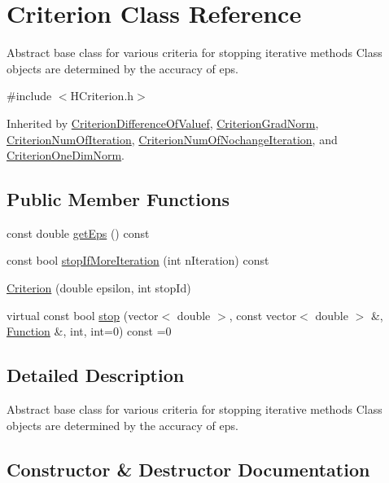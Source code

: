 \hypertarget{class_criterion}{}\section{Criterion Class Reference}
\label{class_criterion}


Abstract base class for various criteria for stopping iterative methods Class objects are determined by the accuracy of eps.  




{\ttfamily \#include $<$H\+Criterion.\+h$>$}



Inherited by \hyperlink{class_criterion_difference_of_valuef}{Criterion\+Difference\+Of\+Valuef}, \hyperlink{class_criterion_grad_norm}{Criterion\+Grad\+Norm}, \hyperlink{class_criterion_num_of_iteration}{Criterion\+Num\+Of\+Iteration}, \hyperlink{class_criterion_num_of_nochange_iteration}{Criterion\+Num\+Of\+Nochange\+Iteration}, and \hyperlink{class_criterion_one_dim_norm}{Criterion\+One\+Dim\+Norm}.

\subsection*{Public Member Functions}
\begin{DoxyCompactItemize}
\item 
const double \hyperlink{class_criterion_a1d04f36050bb555469cea3e9a2f7b6f0}{get\+Eps} () const
\item 
const bool \hyperlink{class_criterion_a579d93bfa87d36a3ae64a39fe3c2d172}{stop\+If\+More\+Iteration} (int n\+Iteration) const
\item 
\hyperlink{class_criterion_a393fa31a40959a1951ab5cfa2fd84be5}{Criterion} (double epsilon, int stop\+Id)
\item 
virtual const bool \hyperlink{class_criterion_aee3e2148c665c72c50c2f870a3ca8cdc}{stop} (vector$<$ double $>$, const vector$<$ double $>$ \&, \hyperlink{class_function}{Function} \&, int, int=0) const =0
\end{DoxyCompactItemize}


\subsection{Detailed Description}
Abstract base class for various criteria for stopping iterative methods Class objects are determined by the accuracy of eps. 

\subsection{Constructor \& Destructor Documentation}
\mbox{\label{class_criterion_a393fa31a40959a1951ab5cfa2fd84be5}} 
